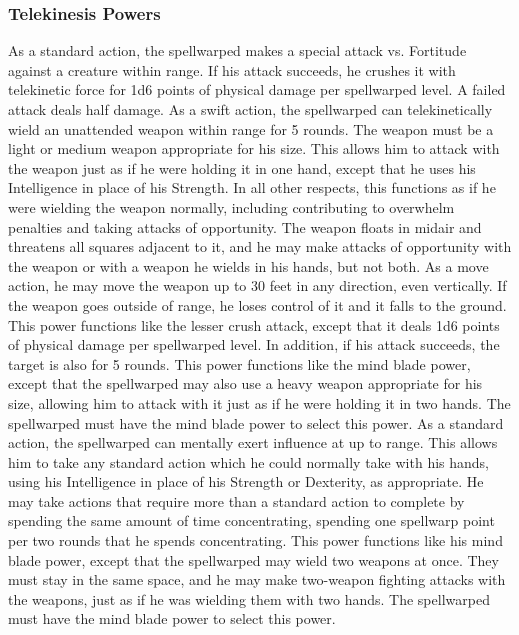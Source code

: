 \subsubsection{Telekinesis Powers}
 As a standard action, the spellwarped makes a special attack vs. Fortitude against a creature within \rngclose range. If his attack succeeds, he crushes it with telekinetic force for 1d6 points of physical damage  per spellwarped level. A failed attack deals half damage.
 As a swift action, the spellwarped can telekinetically wield an unattended weapon within \rngclose range for 5 rounds. The weapon must be a light or medium weapon appropriate for his size. This allows him to attack with the weapon just as if he were holding it in one hand, except that he uses his Intelligence in place of his Strength. In all other respects, this functions as if he were wielding the weapon normally, including contributing to overwhelm penalties and taking attacks of opportunity. The weapon floats in midair and threatens all squares adjacent to it, and he may make attacks of opportunity with the weapon or with a weapon he wields in his hands, but not both.
As a move action, he may move the weapon up to 30 feet in any direction, even vertically. If the weapon goes outside of \rngclose range, he loses control of it and it falls to the ground.
 This power functions like the lesser crush attack, except that it deals 1d6 points of physical damage per spellwarped level. In addition, if his attack succeeds, the target is also \sickened for 5 rounds.
 This power functions like the mind blade power, except that the spellwarped may also use a heavy weapon appropriate for his size, allowing him to attack with it just as if he were holding it in two hands. The spellwarped must have the mind blade power to select this power.
 As a standard action, the spellwarped can mentally exert influence at up to \rngclose range. This allows him to take any standard action which he could normally take with his hands, using his Intelligence in place of his Strength or Dexterity, as appropriate. He may take actions that require more than a standard action to complete by spending the same amount of time concentrating, spending one spellwarp point per two rounds that he spends concentrating.
 This power functions like his mind blade power, except that the spellwarped may wield two weapons at once. They must stay in the same space, and he may make two-weapon fighting attacks with the weapons, just as if he was wielding them with two hands. The spellwarped must have the mind blade power to select this power.
